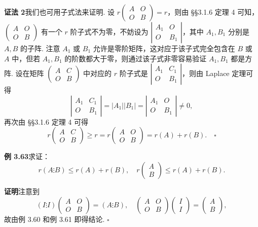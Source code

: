 \documentclass[UTF8,12pt,a4paper,fontset=fandol]{ctexart}
\begin{document}
\noindent\textbf{证法 2}\quad 我们也可用子式法来证明. 设 $r\begin{pmatrix}A&O\\O&B\end{pmatrix}=r$，则由 §§3.1.6 定理 4 可知，$\begin{pmatrix}A&O\\O&B\end{pmatrix}$ 有一个 $r$ 阶子式不为零，不妨设为 $\left|\begin{array}{cc}A_1&O\\O&B_1\end{array}\right|$，其中 $A_1,B_1$ 分别是 $A,B$ 的子阵. 注意 $A_1$ 或 $B_1$ 允许是零阶矩阵，这对应于该子式完全包含在 $B$ 或 $A$ 中，但若 $A_1,B_1$ 的阶数都大于零，则通过该子式非零容易验证 $A_1,B_1$ 都是方阵. 设在矩阵 $\begin{pmatrix}A&C\\O&B\end{pmatrix}$ 中对应的 $r$ 阶子式是 $\left|\begin{array}{cc}A_1&C_1\\O&B_1\end{array}\right|$，则由 Laplace 定理可得
\[
\left|\begin{array}{cc}A_1&C_1\\O&B_1\end{array}\right|=|A_1||B_1|=
\left|\begin{array}{cc}A_1&O\\O&B_1\end{array}\right|\ne 0,
\]
再次由 §§3.1.6 定理 4 可得
\[
r\begin{pmatrix}A&C\\O&B\end{pmatrix}\ge r=r\begin{pmatrix}A&O\\O&B\end{pmatrix}=r(A)+r(B). \quad \square
\]

\noindent\textbf{例 3.63}\quad 求证：
\[
r(A\vdots B)\le r(A)+r(B),\quad r\begin{pmatrix}A\\B\end{pmatrix}\le r(A)+r(B).
\]

\noindent\textbf{证明}\quad 注意到
\[
(I\vdots I)\begin{pmatrix}A&O\\O&B\end{pmatrix}=(A\vdots B),\quad
\begin{pmatrix}A&O\\O&B\end{pmatrix}\begin{pmatrix}I\\I\end{pmatrix}=\begin{pmatrix}A\\B\end{pmatrix},
\]
故由例 3.60 和例 3.61 即得结论. $\square$
\end{document}
